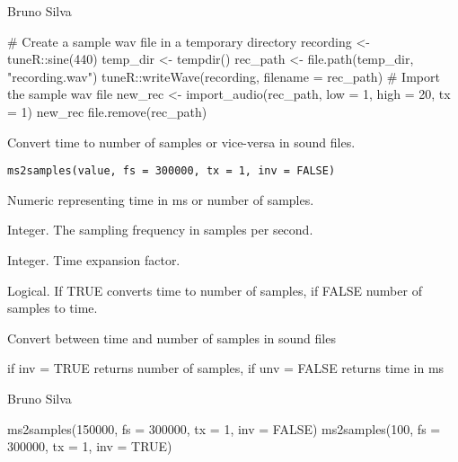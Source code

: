 \documentclass[letterpaper]{book}
\begin{document}
%
\begin{Author}\relax
Bruno Silva
\end{Author}
%
\begin{Examples}
\begin{ExampleCode}
# Create a sample wav file in a temporary directory
recording <- tuneR::sine(440)
temp_dir <- tempdir()
rec_path <- file.path(temp_dir, "recording.wav")
tuneR::writeWave(recording, filename = rec_path)
# Import the sample wav file
new_rec <- import_audio(rec_path, low = 1, high = 20, tx = 1)
new_rec
file.remove(rec_path)
\end{ExampleCode}
\end{Examples}
%
\begin{Description}\relax
Convert time to number of samples or vice-versa
in sound files.
\end{Description}
%
\begin{Usage}
\begin{verbatim}
ms2samples(value, fs = 300000, tx = 1, inv = FALSE)
\end{verbatim}
\end{Usage}
%
\begin{Arguments}
\begin{ldescription}
\item[\code{value}] Numeric representing time in ms or number of samples.

\item[\code{fs}] Integer. The sampling frequency in samples per second.

\item[\code{tx}] Integer. Time expansion factor.

\item[\code{inv}] Logical. If TRUE converts time to number of samples, if FALSE
number of samples to time.
\end{ldescription}
\end{Arguments}
%
\begin{Details}\relax
Convert between time and number of samples in sound files
\end{Details}
%
\begin{Value}
if inv = TRUE returns number of samples, if unv = FALSE
returns time in ms
\end{Value}
%
\begin{Author}\relax
Bruno Silva
\end{Author}
%
\begin{Examples}
\begin{ExampleCode}
ms2samples(150000, fs = 300000, tx = 1, inv = FALSE)
ms2samples(100, fs = 300000, tx = 1, inv = TRUE)
\end{ExampleCode}
\end{Examples}
\end{document}
